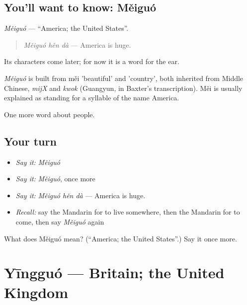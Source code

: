 \subsection*{You'll want to know: Měiguó}
\emph{Měiguó} — \textquotedblleft{}America; the United States\textquotedblright{}.

\begin{quote}
\emph{Měiguó hěn dà} — America is huge.
\end{quote}

Its characters come later; for now it is a word for the ear.

\begin{cousinweb}
\emph{Měiguó} is built from měi 'beautiful' and  'country', both inherited from Middle Chinese, \emph{mijX} and \emph{kwok} (Guangyun, in Baxter's transcription). Měi is usually explained as standing for a syllable of the name America.
\end{cousinweb}

\begin{grammarlens}[title={What you've built}]
One more word about people.
\end{grammarlens}

\subsection*{Your turn}
\begin{itemize}
\raggedright
  \item \emph{Say it:} \emph{Měiguó}
  \item \emph{Say it:} \emph{Měiguó}, once more
  \item \emph{Say it:} \emph{Měiguó hěn dà} — America is huge.
  \item \emph{Recall:} say the Mandarin for to live somewhere, then the Mandarin for to come, then say \emph{Měiguó} again
\end{itemize}

\begin{tcolorbox}[breakable,colback=teal!4,colframe=teal!35!black,title={Before you move on}]
What does Měiguó mean? (\textquotedblleft{}America; the United States\textquotedblright{}.) Say it once more.
\end{tcolorbox}
\section[Yīngguó]{Yīngguó — Britain; the United Kingdom}

\label{lesson:ZH-C36-yingguo}



